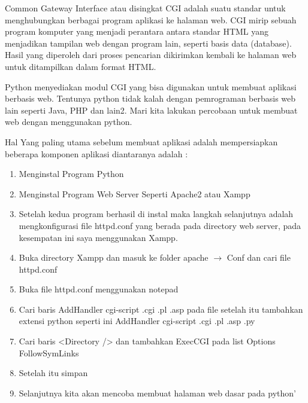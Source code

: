 \begin{enumerate}
\vspace{12pt}
Common Gateway Interface atau disingkat CGI adalah suatu standar untuk menghubungkan berbagai program aplikasi ke halaman web. CGI mirip sebuah program komputer yang menjadi perantara antara standar HTML yang menjadikan tampilan web dengan program lain, seperti basis data (database). Hasil yang diperoleh dari proses pencarian dikirimkan kembali ke halaman web untuk ditampilkan dalam format HTML. \par
\vspace{12pt}
Python menyediakan modul CGI yang bisa digunakan untuk membuat aplikasi berbasis web. Tentunya python tidak kalah dengan pemrograman berbasis web lain seperti Java, PHP dan lain2. Mari kita lakukan percobaan untuk membuat web dengan menggunakan python. \par
\noindent 
Hal Yang paling utama sebelum membuat aplikasi adalah mempersiapkan beberapa komponen aplikasi diantaranya adalah : \par
\noindent 
\begin{enumerate}
	\item Menginstal Program Python \par
	\noindent 
	\item Menginstal Program Web Server Seperti Apache2 atau Xampp \par
	\noindent 
	\item Setelah kedua program berhasil di instal maka langkah selanjutnya adalah mengkonfigurasi file httpd.conf yang berada pada directory web server, pada kesempatan ini saya menggunakan Xampp. \par
	\noindent 
	\item Buka directory Xampp dan masuk ke folder apache  $  \rightarrow  $ Conf dan cari file httpd.conf \par
	\noindent 
	\item Buka file httpd.conf menggunakan notepad \par
	\noindent 
	\item Cari baris AddHandler cgi-script .cgi .pl .asp pada file setelah itu tambahkan extensi python seperti ini AddHandler cgi-script .cgi .pl .asp .py \par
	\noindent 
	\item Cari baris <Directory /> dan tambahkan ExecCGI pada list Options FollowSymLinks \par
	\noindent 
	\item Setelah itu simpan \par
	\noindent 
	\item Selanjutnya kita akan mencoba membuat halaman web dasar pada python’ \par

\end{enumerate}
\end{enumerate}
